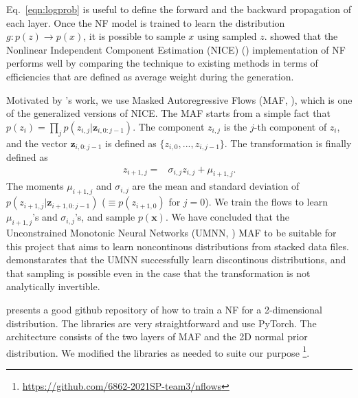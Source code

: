 Eq.~\ref{eqn:logprob} is useful to define the forward and the backward propagation of each layer.
Once the NF model is trained to learn the distribution $g: p(z)\rightarrow p(x)$, it is possible to sample $x$ using sampled $z$. \citet{PhysRevD.101.076002} showed that the Nonlinear Independent Component Estimation (NICE) (\citet{Dinh15}) implementation of NF performs well by comparing the technique to existing methods in terms of efficiencies that are defined as average weight during the generation.

Motivated by \citet{stan}'s work, we use Masked Autoregressive Flows (MAF, \citet{papamakarios2018masked}), which is one of the generalized versions of NICE. The MAF starts from a simple fact that $p(z_{i}) = \prod\limits_{j}p(z_{i,j}|\mathbf{z}_{i,0:j-1})$. The component $z_{i,j}$ is the $j$-th component of $z_i$, and the vector $\mathbf{z}_{i,0:j-1}$ is defined as $\{z_{i, 0}, ..., z_{i, j-1}\}$. The transformation is finally defined as
\begin{align}
    z_{i+1, j}=& \sigma_{i, j} z_{i, j} + \mu_{i+1, j}.
\end{align}
The moments $\mu_{i+1, j}$ and $\sigma_{i, j}$ are the mean and standard deviation of $p(z_{i+1,j}|\mathbf{z}_{i+1,0:j-1})$ ($\equiv p(z_{i+1,0})$ for $j=0$). We train the flows to learn $\mu_{i+1, j}$'s and $\sigma_{i, j}$'s, and sample $p(\mathbf{x})$. We have concluded that the Unconstrained Monotonic Neural Networks (UMNN, \citet{NEURIPS2019_2a084e55}) MAF to be suitable for this project that aims to learn noncontinous distributions from stacked data files. \citet{NEURIPS2019_2a084e55} demonstarates that the UMNN successfully learn discontinous distributions, and that sampling is possible even in the case that the transformation is not analytically invertible.

\citet{nflows} presents a good github repository of how to train a NF for a 2-dimensional distribution. The libraries are very straightforward and use PyTorch. The architecture consists of the two layers of MAF and the 2D normal prior distribution. We modified the libraries as needed to suite our purpose \footnote{\url{https://github.com/6862-2021SP-team3/nflows}}.

